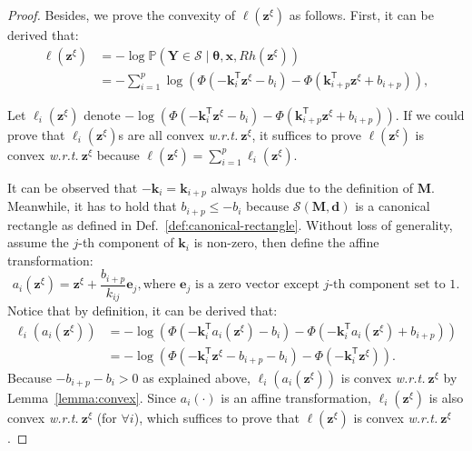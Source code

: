 \documentclass{article}
\theoremstyle{plain}
\theoremstyle{definition}
\def \x {\mathbf{x}}
\def \M {\mathbf{M}}
\def \e {\mathbf{e}}
\def \Y{\mathbf{Y}}
\def \wrt {\textit{w.r.t.}$\ $}
\def \x {\mathbf{x}}
\def \sS {\mathcal{S}}
\def \Y {\mathbf{Y}}
\def \k {\mathbf{k}}
\def \M {\mathbf{M}}
\def \e {\mathbf{e}}
\def \z {\mathbf{z}}
\def \d {\mathbf{d}}
\begin{document}
\begin{proof}
Besides, we prove the convexity of $\ell\left(\z^\xi\right)$ as follows. First, it can be derived that:
\begin{equation}
  \label{eq:convex_derive}
  \begin{aligned}
    \ell\left(\z^\xi\right)
    &= -\log \mathbb{P}(\Y \in \sS\mid \bm{\theta}, \x, Rh(\z^\xi))\\
    &= -\sum_{i=1}^p\log\left(\Phi\left(-\k_i^\mathsf{T} \z^\xi - b_i\right) - \Phi\left(\k^\mathsf{T}_{i+p} \z^\xi + b_{i+p}\right)\right),
  \end{aligned}
\end{equation}

Let $\ell_i\left(\z^\xi\right)$ denote $-\log\left(\Phi\left(-\k_i^\mathsf{T} \z^\xi - b_i\right) - \Phi\left(\k^\mathsf{T}_{i+p} \z^\xi + b_{i+p}\right)\right)$. If we could prove that $\ell_i\left(\z^\xi\right)$s are all convex \wrt $\z^\xi$, it suffices to prove $\ell\left(\z^\xi\right)$ is convex \wrt $\z^\xi$ because $\ell\left(\z^\xi\right)=\sum_{i=1}^p \ell_i\left(\z^\xi\right)$.

It can be observed that $-\k_i=\k_{i+p}$ always holds due to the definition of $\M$. Meanwhile, it has to hold that $b_{i+p}\leq-b_{i}$ because $\sS(\M,\d)$ is a canonical rectangle as defined in Def.~\ref{def:canonical-rectangle}. 
Without loss of generality, assume the $j$-th component of $\k_i$ is non-zero, then define the affine transformation:
\[
  a_i\left(\z^\xi\right) = \z^\xi+\frac{b_{i+p}}{k_{ij}}\e_j, \text{where $\e_j$ is a zero vector except $j$-th component set to 1}.
\]
 Notice that by definition, it can be derived that:
\[
\begin{aligned}
  \ell_i\left(a_i\left(\z^\xi\right)\right) &=-\log\left(\Phi\left(-\k_i^\mathsf{T}a_i\left(\z^\xi\right) - b_i\right) - \Phi\left(-\k^\mathsf{T}_{i}a_i\left(\z^\xi\right)+ b_{i+p}\right)\right)\\
  &= -\log\left(\Phi\left(-\k_i^\mathsf{T}\z^\xi-b_{i+p} - b_i\right) - \Phi\left(-\k^\mathsf{T}_{i}\z^\xi\right)\right).
\end{aligned}
\]
Because $-b_{i+p} - b_i>0$ as explained above, $\ell_i\left(a_i\left(\z^\xi\right)\right)$ is convex \wrt $\z^\xi$ by Lemma~\ref{lemma:convex}. 
Since $a_i(\cdot)$ is an affine transformation, $\ell_i\left( \z^\xi\right)$ is also convex \wrt $\z^\xi$ (for $\forall i$), which suffices to prove that $\ell\left(\z^\xi\right)$ is convex \wrt $\z^\xi$.

\end{proof}
\end{document}
